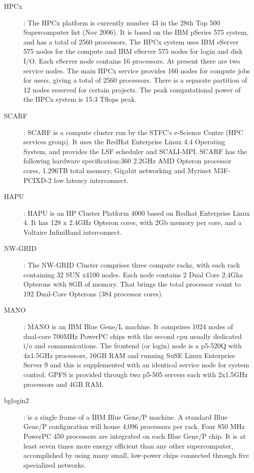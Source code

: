 \begin{description}
\item[HPCx]: The HPCx platform is currently number 43 in the 28th Top 500 Supercomputer list (Nov 2006). It is based on the IBM pSeries 575 system, and has a total of 2560 processors. The HPCx system uses IBM eServer 575 nodes for the compute and IBM eServer 575 nodes for login and disk I/O. Each eServer node contains 16 processors. At present there are two service nodes. The main HPCx service provides 160 nodes for compute jobs for users, giving a total of 2560 processors. There is a separate partition of 12 nodes reserved for certain projects. The peak computational power of the HPCx system is 15.3 Tflops peak.
\item[SCARF]: SCARF is a compute cluster run by the STFC's e-Science Centre (HPC services group). It uses the RedHat Enterprise Linux 4.4 Operating System, and provides the LSF scheduler and SCALI-MPI. SCARF has the following hardware specification:360 2.2GHz AMD Opteron processor cores, 1.296TB total memory, Gigabit networking and Myrinet M3F-PCIXD-2 low latency interconnect.
\item[HAPU]: HAPU is an HP Cluster Platform 4000 based on Redhat Enterprise Linux 4. It has 128 x 2.4GHz Opteron cores, with 2Gb memory per core, and a Voltaire InfiniBand interconnect.
\item[NW-GRID]: The NW-GRID Cluster comprises three compute racks, with each rack containing 32 SUN x4100 nodes. Each node contains 2 Dual Core 2.4Ghz Opterons with 8GB of memory. That brings the total processor count to 192 Dual-Core Opterons (384 processor cores). 
\item[MANO]: MANO is an IBM Blue Gene/L machine. It comprises 1024 nodes of dual-core 700MHz PowerPC chips with the second cpu usually dedicated i/o and communications. The frontend (or login) node is a p5-520Q with 4x1.5GHz processors, 16GB RAM and running SuSE Linux Enterprise Server 9 and this is supplemented with an identical service node for system control. GPFS is provided through two p5-505 servers each with 2x1.5GHz processors and 4GB RAM.
\item[bglogin2]: is a single frame of a IBM Blue Gene/P machine. A standard Blue Gene/P configuration will house 4,096 processors per rack. Four 850 MHz PowerPC 450 processors are integrated on each Blue Gene/P chip. It is at least seven times more energy efficient than any other supercomputer, accomplished by using many small, low-power chips connected through five specialized networks.
\end{description}